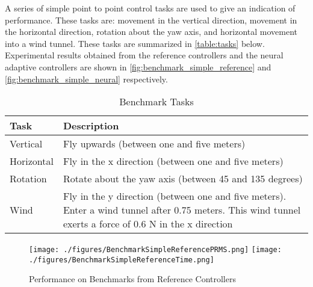 \documentclass[letterpaper,12pt,titlepage,oneside,final]{book}
\begin{document}
A series of simple point to point control tasks are used to give an indication of performance. 
These tasks are: movement in the vertical direction, movement in the horizontal direction, rotation about the yaw axis, and horizontal movement into a wind tunnel. %
These tasks are summarized in \autoref{table:tasks} below.
Experimental results obtained from the reference controllers and the neural adaptive controllers are shown in \autoref{fig:benchmark_simple_reference} and \autoref{fig:benchmark_simple_neural} respectively. %


\begin{table}
\caption{Benchmark Tasks} \label{table:tasks}
\begin{center}
\begin{tabular}{| l | p{9cm} |}

\hline
Task & Description \\ \hline
Vertical & Fly upwards (between one and five meters) \\ \hline
Horizontal & Fly in the x direction (between one and five meters) \\ \hline
Rotation & Rotate about the yaw axis (between 45 and 135 degrees) \\ \hline
Wind & Fly in the y direction (between one and five meters). Enter a wind tunnel after 0.75 meters. This wind tunnel exerts a force of 0.6 N in the x direction \\ \hline

\end{tabular}
\end{center}
\end{table}


\begin{figure}
\centering
\texttt{[image: ./figures/BenchmarkSimpleReferencePRMS.png]} %
\texttt{[image: ./figures/BenchmarkSimpleReferenceTime.png]} %
\caption{Performance on Benchmarks from Reference Controllers}
\label{fig:benchmark_simple_reference}
\end{figure}
\end{document}
